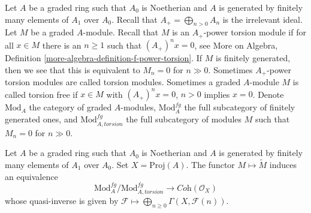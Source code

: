 \noindent
Let $A$ be a graded ring such that $A_0$ is Noetherian and $A$ is generated
by finitely many elements of $A_1$ over $A_0$. Recall that
$A_+ = \bigoplus_{n > 0} A_n$ is the irrelevant ideal.
Let $M$ be a graded $A$-module. Recall that
$M$ is an $A_+$-power torsion module if for all $x \in M$
there is an $n \geq 1$ such that $(A_+)^n x = 0$, see
More on Algebra, Definition \ref{more-algebra-definition-f-power-torsion}.
If $M$ is finitely generated, then we see that
this is equivalent to $M_n = 0$ for $n \gg 0$.
Sometimes $A_+$-power torsion modules are called torsion modules.
Sometimes a graded $A$-module $M$ is called torsion free if
$x \in M$ with $(A_+)^n x = 0$, $n > 0$ implies $x = 0$.
Denote $\text{Mod}_A$ the category of graded $A$-modules,
$\text{Mod}^{fg}_A$ the full subcategory of finitely generated ones,
and $\text{Mod}^{fg}_{A, torsion}$ the full subcategory of
modules $M$ such that $M_n = 0$ for $n \gg 0$.

\begin{proposition}
\label{proposition-coherent-modules-on-proj}
Let $A$ be a graded ring such that $A_0$ is Noetherian and $A$ is generated
by finitely many elements of $A_1$ over $A_0$.
Set $X = \text{Proj}(A)$. The functor $M \mapsto \widetilde M$
induces an equivalence
$$
\text{Mod}^{fg}_A/\text{Mod}^{fg}_{A, torsion}
\longrightarrow
\textit{Coh}(\mathcal{O}_X)
$$
whose quasi-inverse is given by
$\mathcal{F} \longmapsto \bigoplus_{n \geq 0} \Gamma(X, \mathcal{F}(n))$.
\end{proposition}

